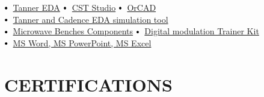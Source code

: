 \documentclass[letterpaper,11pt]{article}
\newcommand\sbullet[1][.5]{\mathbin{\vcenter{\hbox{\scalebox{#1}{$\bullet$}}}}}
\begin{document}
$\sbullet[.75] \hspace{0.2cm}${\href{certificateLink.com}{Tanner EDA}} \hspace{1cm}
$\sbullet[.75] \hspace{0.1cm}$ {\href{certificateLink.com}{CST Studio}} \hspace{2.6cm}
$\sbullet[.75] \hspace{0.2cm}${\href{certificateLink.com}{OrCAD}} \\

$\sbullet[.75] \hspace{0.2cm}${\href{certificateLink.com}{Tanner and Cadence EDA simulation tool}} \\

$\sbullet[.75] \hspace{0.2cm}${\href{certificateLink.com}{Microwave Benches Components}} \hspace{0.5cm}
$\sbullet[.75] \hspace{0.2cm}${\href{certificateLink.com}{Digital modulation Trainer Kit}} \\
$\sbullet[.75] \hspace{0.2cm}${\href{certificateLink.com}{MS Word, MS PowerPoint, MS Excel}} \\
 
\section{CERTIFICATIONS}




\end{document}
